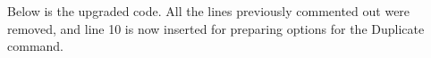 

Below is the upgraded code. All the lines previously commented out were removed, and line 10 is now inserted for preparing options for the Duplicate command.